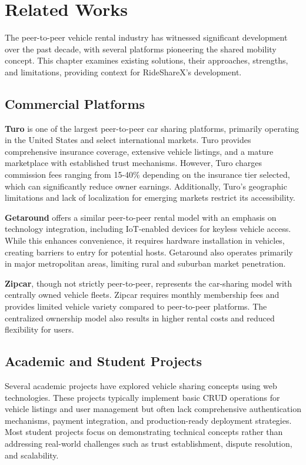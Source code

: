 \documentclass[12pt,a4paper]{report}
\begin{document}
	\chapter{Related Works}
	
	The peer-to-peer vehicle rental industry has witnessed significant development over the past decade, with several platforms pioneering the shared mobility concept. This chapter examines existing solutions, their approaches, strengths, and limitations, providing context for RideShareX's development.
	
	\section{Commercial Platforms}
	
	\textbf{Turo} is one of the largest peer-to-peer car sharing platforms, primarily operating in the United States and select international markets. Turo provides comprehensive insurance coverage, extensive vehicle listings, and a mature marketplace with established trust mechanisms. However, Turo charges commission fees ranging from 15-40\% depending on the insurance tier selected, which can significantly reduce owner earnings. Additionally, Turo's geographic limitations and lack of localization for emerging markets restrict its accessibility.
	
	\textbf{Getaround} offers a similar peer-to-peer rental model with an emphasis on technology integration, including IoT-enabled devices for keyless vehicle access. While this enhances convenience, it requires hardware installation in vehicles, creating barriers to entry for potential hosts. Getaround also operates primarily in major metropolitan areas, limiting rural and suburban market penetration.
	
	\textbf{Zipcar}, though not strictly peer-to-peer, represents the car-sharing model with centrally owned vehicle fleets. Zipcar requires monthly membership fees and provides limited vehicle variety compared to peer-to-peer platforms. The centralized ownership model also results in higher rental costs and reduced flexibility for users.
	
	\section{Academic and Student Projects}
	
	Several academic projects have explored vehicle sharing concepts using web technologies. These projects typically implement basic CRUD operations for vehicle listings and user management but often lack comprehensive authentication mechanisms, payment integration, and production-ready deployment strategies. Most student projects focus on demonstrating technical concepts rather than addressing real-world challenges such as trust establishment, dispute resolution, and scalability.
	
\end{document}
